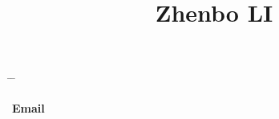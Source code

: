 

\title{Zhenbo LI} %

\vspace{-0.5cm}
\parbox[c][3em][t]{0.9\textwidth}{ %
	\begin{tabbing} %
		\hspace{3cm} \= \hspace{4cm} \= \kill %
		
{\bf Email} \> 
		
	\end{tabbing}
}

\vspace{-5mm}